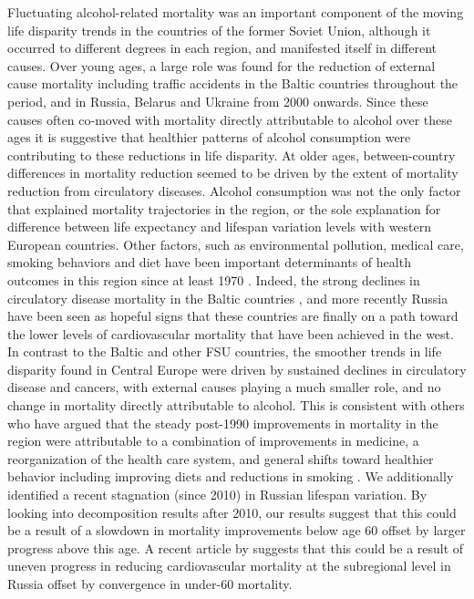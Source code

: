 \documentclass{article}
\begin{document}
\begin{spacing}{1.5}
Fluctuating alcohol-related mortality was an important component of the moving life disparity trends in the countries of the former Soviet Union, although it occurred to different degrees in each region, and manifested itself in different causes. Over young ages, a large role was found for the reduction of external cause mortality including traffic accidents in the Baltic countries throughout the period, and in Russia, Belarus and Ukraine from 2000 onwards. Since these causes often co-moved with mortality directly attributable to alcohol over these ages it is suggestive that healthier patterns of alcohol consumption were contributing to these reductions in life disparity. At older ages, between-country differences in mortality reduction seemed to be driven by the extent of mortality reduction from circulatory diseases. Alcohol consumption was not the only factor that explained mortality trajectories in the region, or the sole explanation for difference between life expectancy and lifespan variation levels with western European countries. Other factors, such as environmental pollution, medical care, smoking behaviors and diet have been important determinants of health outcomes in this region since at least 1970 \citep{bobak1996east}. Indeed, the strong declines in circulatory disease mortality in the Baltic countries \citep{jasilionis2011}, and more recently Russia \citep{grigoriev2014recent} have been seen as hopeful signs that these countries are finally on a path toward the lower levels of cardiovascular mortality that have been achieved in the west. \\

In contrast to the Baltic and other FSU countries, the smoother trends in life disparity found in Central Europe were driven by sustained declines in circulatory disease and cancers, with external causes playing a much smaller role, and no change in mortality directly attributable to alcohol. This is consistent with others who have argued that the steady post-1990 improvements in mortality in the region were attributable to a combination of improvements in medicine, a reorganization of the health care system, and general shifts toward healthier behavior including improving diets and reductions in smoking \citep{pajkak2011cardiovascular, zatonski1998ecological, Fihel2017, cifkova2010, cooper1984rising, rychtarikova2004,nolte2000changingb,nolte2000changing}. We additionally identified a recent stagnation (since 2010) in Russian lifespan variation. By looking into decomposition results after 2010, our results suggest that this could be a result of a slowdown in mortality improvements below age 60 offset by larger progress above this age. A recent article by \cite{Timonin2017} suggests that this could be a result of uneven progress in reducing cardiovascular mortality at the subregional level in Russia offset by convergence in under-60 mortality. \\ 


\end{spacing}
\end{document}
